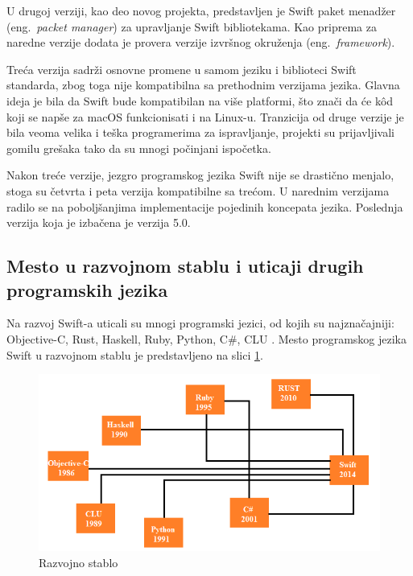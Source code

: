 \documentclass[a4paper]{article}
\begin{document}
U drugoj verziji, kao deo novog projekta, predstavljen je Swift paket menadžer (eng.~{\em packet manager}) za upravljanje Swift bibliotekama. Kao priprema za naredne verzije dodata je provera verzije izvršnog okruženja (eng.~{\em framework}). 

Treća verzija sadrži osnovne promene u samom jeziku i biblioteci Swift standarda, zbog toga nije kompatibilna sa prethodnim verzijama jezika. Glavna ideja je bila da Swift bude kompatibilan na više platformi, što znači da će k\^{o}d koji se napše za macOS funkcionisati i na Linux-u. Tranzicija od druge verzije je bila veoma velika i teška programerima za ispravljanje, projekti su prijavljivali gomilu grešaka tako da su mnogi počinjani ispočetka. 

Nakon treće verzije, jezgro programskog jezika Swift nije se drastično menjalo, stoga su četvrta i peta verzija kompatibilne sa trećom. U narednim verzijama radilo se na poboljšanjima implementacije pojedinih koncepata jezika. Poslednja verzija koja je izbačena je verzija 5.0.
  
\subsection{Mesto u razvojnom stablu i uticaji drugih programskih jezika}
\label{subsec:podnaslovRazvojnoStablo}
Na razvoj Swift-a uticali su mnogi programski jezici, od kojih su najznačajniji: Objective-C, Rust, Haskell, Ruby, Python, C\#, CLU \cite{chris_sajt}. Mesto programskog jezika Swift u razvojnom stablu je predstavljeno na slici \ref{fig:razvojno_stablo}.

\begin{figure}[h!]
\begin{center}
\includegraphics[scale=0.5]{razvojno_stablo.png}
\end{center}
\caption{Razvojno stablo}
\label{fig:razvojno_stablo}
\end{figure}
\end{document}
